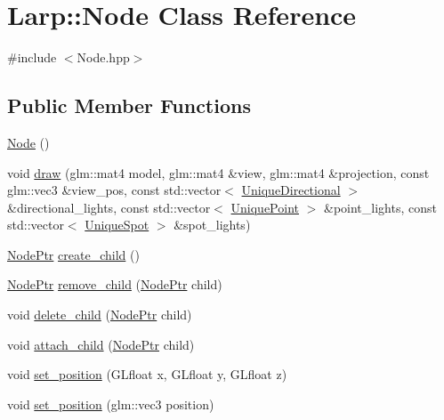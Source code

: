 \hypertarget{classLarp_1_1Node}{}\section{Larp\+:\+:Node Class Reference}
\label{classLarp_1_1Node}


{\ttfamily \#include $<$Node.\+hpp$>$}

\subsection*{Public Member Functions}
\begin{DoxyCompactItemize}
\item 
\hyperlink{classLarp_1_1Node_a2cb8fc6e60b762b02226d73489ac5099}{Node} ()
\item 
void \hyperlink{classLarp_1_1Node_aca27ebdb37e7dde6ce19e8b886b01b14}{draw} (glm\+::mat4 model, glm\+::mat4 \&view, glm\+::mat4 \&projection, const glm\+::vec3 \&view\+\_\+pos, const std\+::vector$<$ \hyperlink{namespaceLarp_af87ce889468b60d51aa1479335ba19bf}{Unique\+Directional} $>$ \&directional\+\_\+lights, const std\+::vector$<$ \hyperlink{namespaceLarp_acd7cacff15535544525abc2e90e07b91}{Unique\+Point} $>$ \&point\+\_\+lights, const std\+::vector$<$ \hyperlink{namespaceLarp_a288b58c470c3ed41d3b23e764ba5b6eb}{Unique\+Spot} $>$ \&spot\+\_\+lights)
\item 
\hyperlink{namespaceLarp_a171c1dc8b70cfb441b15d7386780db23}{Node\+Ptr} \hyperlink{classLarp_1_1Node_a3ad8fa3c292ce51ce8ac0922c96608f1}{create\+\_\+child} ()
\item 
\hyperlink{namespaceLarp_a171c1dc8b70cfb441b15d7386780db23}{Node\+Ptr} \hyperlink{classLarp_1_1Node_accd1116b2d35500ae519588d07f1f30e}{remove\+\_\+child} (\hyperlink{namespaceLarp_a171c1dc8b70cfb441b15d7386780db23}{Node\+Ptr} child)
\item 
void \hyperlink{classLarp_1_1Node_a091f322ac9a2dcfcb81ab38bdff61399}{delete\+\_\+child} (\hyperlink{namespaceLarp_a171c1dc8b70cfb441b15d7386780db23}{Node\+Ptr} child)
\item 
void \hyperlink{classLarp_1_1Node_abbf90d7e84f9c8144bc5532d288ce3ae}{attach\+\_\+child} (\hyperlink{namespaceLarp_a171c1dc8b70cfb441b15d7386780db23}{Node\+Ptr} child)
\item 
void \hyperlink{classLarp_1_1Node_a44070f7bb06cdca4fafbdf65f0d6118e}{set\+\_\+position} (G\+Lfloat x, G\+Lfloat y, G\+Lfloat z)
\item 
void \hyperlink{classLarp_1_1Node_a8eef7a9829817bfe9b2ff3bed5b0c3a8}{set\+\_\+position} (glm\+::vec3 position)

\end{DoxyCompactItemize}
